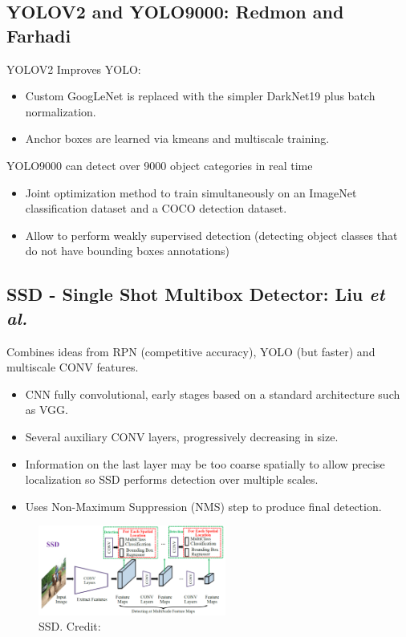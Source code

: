 \documentclass{beamer}
\begin{document}
\subsection{YOLOV2 and YOLO9000: Redmon and Farhadi \cite{redmon_yolo9000_2016}}
\begin{frame}{}
	YOLOV2 Improves YOLO:
	\begin{itemize}
		\item Custom GoogLeNet is replaced with the simpler DarkNet19 plus batch normalization.
		\item Anchor boxes are learned via kmeans and multiscale training.
	\end{itemize}
	YOLO9000 can detect over 9000 object categories in real time
	\begin{itemize}
		\item Joint optimization method to train simultaneously on an ImageNet classification dataset and a COCO detection dataset.
		\item Allow to perform weakly supervised detection (detecting object classes that do not have bounding boxes annotations)
	\end{itemize}
\end{frame}


\subsection{SSD - Single Shot Multibox Detector: Liu \it{et al.} \cite{liu_ssd_2016}}
\begin{frame}{}
	Combines ideas from RPN (competitive accuracy), YOLO (but faster) and multiscale CONV features.
	\begin{itemize}
		\item CNN fully convolutional, early stages based on a standard architecture such as VGG.
		\item Several auxiliary CONV layers, progressively decreasing in size.
		\item Information on the last layer may be too coarse spatially to allow precise localization so SSD performs detection over multiple scales.
		\item Uses Non-Maximum Suppression (NMS) step to produce final detection.
	\end{itemize}
	\begin{figure}
		\centering
		\includegraphics[width=0.55\textwidth]{images/ssd.png}
		\caption{SSD.
			\hbox{\scriptsize Credit:}}
	\end{figure}
\end{frame}
\end{document}
